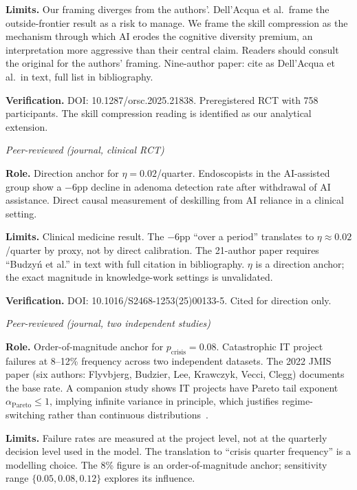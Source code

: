 \documentclass[11pt,a4paper]{article}
\begin{document}
\begin{appendices}
\begin{description}[style=nextline, leftmargin=0pt, labelindent=0pt]
\textbf{Limits.}
Our framing diverges from the authors'. Dell'Acqua et al.\ frame the
outside-frontier result as a risk to manage. We frame the skill compression
as the mechanism through which AI erodes the cognitive diversity premium, an
interpretation more aggressive than their central claim. Readers should
consult the original for the authors' framing. Nine-author paper: cite as
Dell'Acqua et al.\ in text, full list in bibliography.

\textbf{Verification.}
DOI: 10.1287/orsc.2025.21838. Preregistered RCT with 758 participants. The
skill compression reading is identified as our analytical extension.

\item[\cite{budzyn_lancetgh_2025} --- Budzy\'{n} et al.\
(2025), Lancet Gastroenterology \& Hepatology.]
\hfill\textit{Peer-reviewed (journal, clinical RCT)}

\textbf{Role.}
Direction anchor for $\eta = 0.02$/quarter. Endoscopists in the AI-assisted
group show a $-6$pp decline in adenoma detection rate after withdrawal of AI
assistance. Direct causal measurement of deskilling from AI reliance in a
clinical setting.

\textbf{Limits.}
Clinical medicine result. The $-6$pp ``over a period'' translates to
$\eta \approx 0.02$/quarter by proxy, not by direct calibration. The
21-author paper requires ``Budzy\'{n} et al.'' in text with full citation in
bibliography. $\eta$ is a direction anchor; the exact magnitude in
knowledge-work settings is unvalidated.

\textbf{Verification.}
DOI: 10.1016/S2468-1253(25)00133-5. Cited for direction only.

\item[\cite{flyvbjerg_jmis_2022} --- Flyvbjerg et al.\
(2022), JMIS.]
\hfill\textit{Peer-reviewed (journal, two independent studies)}

\textbf{Role.}
Order-of-magnitude anchor for $p_{\text{crisis}} = 0.08$. Catastrophic IT
project failures at 8--12\% frequency across two independent datasets. The
2022 JMIS paper (six authors: Flyvbjerg, Budzier, Lee, Krawczyk, Vecci,
Clegg) documents the base rate. A companion study shows IT projects have
Pareto tail exponent $\alpha_{\text{Pareto}} \leq 1$, implying infinite
variance in principle, which justifies regime-switching rather than
continuous distributions~\cite{flyvbjerg_pmj_2025}.

\textbf{Limits.}
Failure rates are measured at the project level, not at the quarterly
decision level used in the model. The translation to ``crisis quarter
frequency'' is a modelling choice. The 8\% figure is an order-of-magnitude
anchor; sensitivity range $\{0.05, 0.08, 0.12\}$ explores its influence.


\end{description}
\end{appendices}
\end{document}
